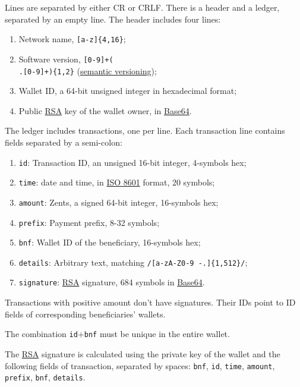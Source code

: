\documentclass[11pt,oneside]{article}
\newcommand\dd[1]{\colorbox{gray!30}{\texttt{#1}}}
\begin{document}
Lines are separated by either CR or CRLF.
There is a header and a ledger, separated by an empty line.
The header includes four lines:

\begin{enumerate}
  \item Network name, \dd{[a-z]\{4,16\}};
  \item Software version, \dd{[0-9]+(\\.[0-9]+)\{1,2\}} (\href{https://semver.org/}{semantic versioning});
  \item Wallet ID, a 64-bit unsigned integer in hexadecimal format;
  \item Public \href{https://en.wikipedia.org/wiki/RSA_(cryptosystem)}{RSA}
    key of the wallet owner, in \href{https://en.wikipedia.org/wiki/Base64}{Base64}.
\end{enumerate}

The ledger includes transactions, one per line. Each transaction line
contains fields separated by a semi-colon:

\begin{enumerate}
  \item \dd{id}: Transaction ID, an unsigned 16-bit integer, 4-symbols hex;
  \item \dd{time}: date and time, in \href{https://en.wikipedia.org/wiki/ISO_8601}{ISO 8601} format, 20 symbols;
  \item \dd{amount}: Zents, a signed 64-bit integer, 16-symbols hex;
  \item \dd{prefix}: Payment prefix, 8-32 symbols;
  \item \dd{bnf}: Wallet ID of the beneficiary, 16-symbols hex;
  \item \dd{details}: Arbitrary text, matching \dd{/[a-zA-Z0-9 -.]\{1,512\}/};
  \item \dd{signature}: \href{https://en.wikipedia.org/wiki/RSA_(cryptosystem)}{RSA} signature,
    684 symbols in \href{https://en.wikipedia.org/wiki/Base64}{Base64}.
\end{enumerate}

Transactions with positive amount don't have signatures.
Their IDs point to ID fields of corresponding beneficiaries' wallets.

The combination \dd{id}+\dd{bnf}
must be unique in the entire wallet.

The \href{https://en.wikipedia.org/wiki/RSA_(cryptosystem)}{RSA}
signature is calculated using the private key of the
wallet and the following fields of transaction, separated by spaces:
\dd{bnf}, \dd{id}, \dd{time}, \dd{amount}, \dd{prefix}, \dd{bnf}, \dd{details}.
\end{document}
